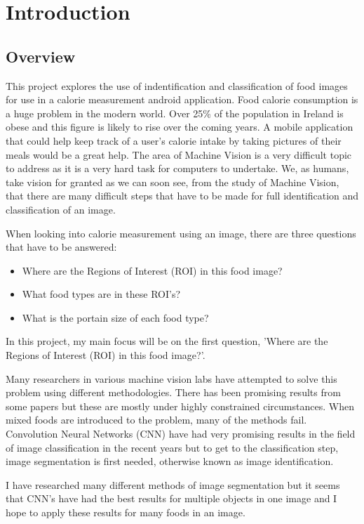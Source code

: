\chapter{Introduction}
\label{intro}

\section{Overview}
This project explores the use of indentification and classification of food images for use in a calorie measurement android application.
Food calorie consumption is a huge problem in the modern world.
Over 25\% of the population in Ireland is obese and this figure is likely to rise over the coming years.
A mobile application that could help keep track of a user's calorie intake by taking pictures of their meals would be a great help.
The area of Machine Vision is a very difficult topic to address as it is a very hard task for computers to undertake.
We, as humans, take vision for granted as we can soon see, from the study of Machine Vision, that there are many difficult steps that have to be made for full identification and classification of an image.

When looking into calorie measurement using an image, there are three questions that have to be answered:
\begin{itemize}
\item{Where are the Regions of Interest (ROI) in this food image?}
\item{What food types are in these ROI's?}
\item{What is the portain size of each food type?}
\end{itemize}
In this project, my main focus will be on the first question, 'Where are the Regions of Interest (ROI) in this food image?'.

Many researchers in various machine vision labs have attempted to solve this
problem using different methodologies.
There has been promising results from some papers but these are mostly under highly constrained circumstances.
When mixed foods are introduced to the problem, many of the methods fail.
Convolution Neural Networks (CNN) have had very promising results in the field of image classification in the recent years but to get to the classification step, image segmentation is first needed, otherwise known as image identification.

I have researched many different methods of image segmentation but it seems that CNN's have had the best results for multiple objects in one image and I hope to apply these results for many foods in an image.

